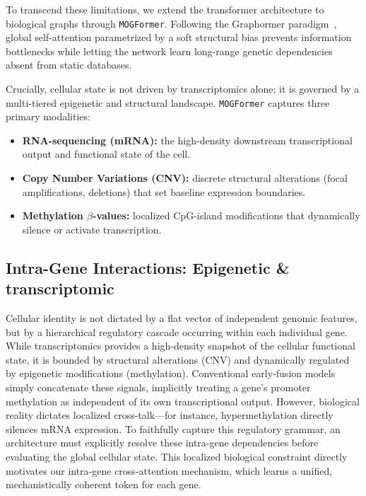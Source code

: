 \documentclass[10pt, twocolumn]{article}
\begin{document}
To transcend these limitations, we extend the transformer architecture to
biological graphs through \texttt{MOGFormer}. Following the Graphormer
paradigm~\cite{ying2021graphormer}, global self-attention parametrized by a soft
structural bias prevents information bottlenecks while letting the network learn
long-range genetic dependencies absent from static databases.

Crucially, cellular state is not driven by transcriptomics alone; it is governed
by a multi-tiered epigenetic and structural landscape. \texttt{MOGFormer}
captures three primary modalities:
\begin{itemize}
    \item \textbf{RNA-sequencing (mRNA):} the high-density downstream
    transcriptional output and functional state of the cell.
    \item \textbf{Copy Number Variations (CNV):} discrete structural alterations
    (focal amplifications, deletions) that set baseline expression boundaries.
    \item \textbf{Methylation $\beta$-values:} localized CpG-island modifications
    that dynamically silence or activate transcription.
\end{itemize}

\subsection*{Intra-Gene Interactions: Epigenetic \& transcriptomic}
Cellular identity is not dictated by a flat vector of independent genomic features, but by a hierarchical regulatory cascade occurring within each individual gene. While transcriptomics provides a high-density snapshot of the cellular functional state, it is bounded by structural alterations (CNV) and dynamically regulated by epigenetic modifications (methylation). Conventional early-fusion models simply concatenate these signals, implicitly treating a gene's promoter methylation as independent of its own transcriptional output. However, biological reality dictates localized cross-talk—for instance, hypermethylation directly silences mRNA expression. To faithfully capture this regulatory grammar, an architecture must explicitly resolve these intra-gene dependencies before evaluating the global cellular state. This localized biological constraint directly motivates our intra-gene cross-attention mechanism, which learns a unified, mechanistically coherent token for each gene.
\end{document}
